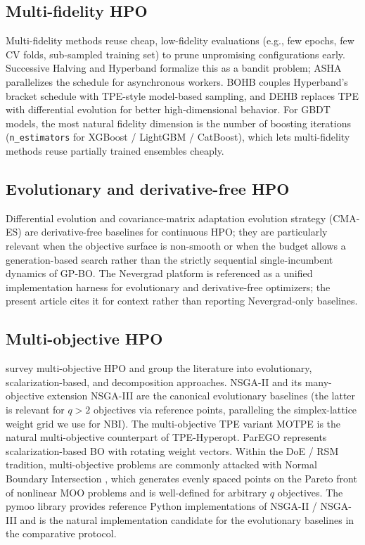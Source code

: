 \subsection{Multi-fidelity HPO}\label{sec:rw-multifidelity}
Multi-fidelity methods reuse cheap, low-fidelity evaluations
(e.g., few epochs, few CV folds, sub-sampled training set) to
prune unpromising configurations early. Successive Halving and
Hyperband \citep{li2017hyperband} formalize this as a bandit problem;
ASHA \citep{li2020asha} parallelizes the schedule for asynchronous
workers. BOHB \citep{falkner2018bohb} couples Hyperband's bracket
schedule with TPE-style model-based sampling, and DEHB
\citep{awad2021dehb} replaces TPE with differential evolution
\citep{storn1997differential} for better high-dimensional behavior.
For GBDT models, the most natural fidelity dimension is the number of
boosting iterations (\texttt{n\_estimators} for XGBoost / LightGBM /
CatBoost), which lets multi-fidelity methods reuse partially trained
ensembles cheaply.

\subsection{Evolutionary and derivative-free
HPO}\label{sec:rw-evolutionary}
Differential evolution \citep{storn1997differential} and
covariance-matrix adaptation evolution strategy (CMA-ES)
\citep{hansen2001cmaes} are derivative-free baselines for continuous
HPO; they are particularly relevant when the objective surface is
non-smooth or when the budget allows a generation-based search rather
than the strictly sequential single-incumbent dynamics of GP-BO. The
Nevergrad platform \citep{rapin2018nevergrad} is referenced as a
unified implementation harness for evolutionary and derivative-free
optimizers; the present article cites it for context rather than
reporting Nevergrad-only baselines.

\subsection{Multi-objective HPO}\label{sec:rw-moo}
\citet{morales2022survey} survey multi-objective HPO and group the
literature into evolutionary, scalarization-based, and decomposition
approaches. NSGA-II \citep{deb2002nsga2} and its many-objective
extension NSGA-III \citep{deb2014nsga3} are the canonical
evolutionary baselines (the latter is relevant for $q\!>\!2$
objectives via reference points, paralleling the simplex-lattice
weight grid we use for NBI). The multi-objective TPE variant MOTPE
\citep{ozaki2020motpe} is the natural multi-objective counterpart of
TPE-Hyperopt. ParEGO \citep{knowles2006parego} represents
scalarization-based BO with rotating weight vectors. Within the
DoE / RSM tradition, multi-objective problems are commonly attacked
with Normal Boundary Intersection \citep{das1998nbi}, which generates
evenly spaced points on the Pareto front of nonlinear MOO problems
and is well-defined for arbitrary $q$ objectives. The pymoo library
\citep{blank2020pymoo} provides reference Python implementations of
NSGA-II / NSGA-III and is the natural implementation candidate for the
evolutionary baselines in the comparative protocol.

